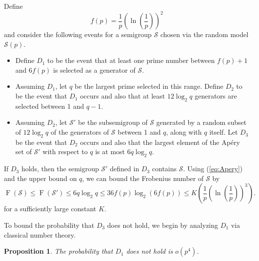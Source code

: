 \documentclass[11pt]{amsart}
\newtheorem{proposition}[theorem]{Proposition}
\theoremstyle{definition}
\theoremstyle{remark}
\def\nsg{\ensuremath{\mathcal{S}}}
\DeclareMathOperator\F{F}
\begin{document}


Define
\[ f(p) = \frac{1}{p} \left( \ln \left( \frac{1}{p} \right) \right)^2 \]
and consider the following events for a semigroup $\nsg$ chosen via the random model $\nsg(p)$.
 \begin{itemize}
\item Define $D_1$ to be the event that at least one prime number between $f(p)+1$ and $6f(p)$ is selected as a generator of $\nsg$. 
\item Assuming $D_1$, let $q$ be the largest prime selected in this range. Define $D_2$ to be the event that $D_1$ occurs and also that at least $12 \log_2 q$ generators are selected between 1 and $q-1$. 
\item Assuming $D_2$, let $\nsg'$ be the subsemigroup of $\nsg$ generated by a random subset of $12 \log_2q$ of the generators of $\nsg$ between 1 and $q$, along with $q$ itself. Let $D_3$ be the event that $D_2$ occurs and also that the largest element of the Ap\'ery set of $\nsg'$ with respect to $q$ is at most $6q \log_2 q$.
 \end{itemize}

If $D_3$ holds, then the semigroup $\nsg'$ defined in $D_3$ contains $\nsg$. Using (\ref{eq:Apery}) and the upper bound on $q$, we can bound the Frobenius number of $\nsg$ by 
\begin{equation} \F(\nsg) \leq \F(\nsg') \leq 6q \log_2 q \leq 36f(p) \log_2(6f(p)) \leq K \left(\frac{1}{p} \left( \ln \left(\frac{1}{p}\right)\right)^3  \right). \label{eq:u-function}
\end{equation}
for a sufficiently large constant $K$.

To bound the probability that $D_3$ does not hold, we begin by analyzing $D_1$ via classical number theory.  

\begin{proposition} \label{prop:notD1}
 The probability that $D_1$ does not hold is $o\left(p^4\right)$. 
\end{proposition}
\end{document}
